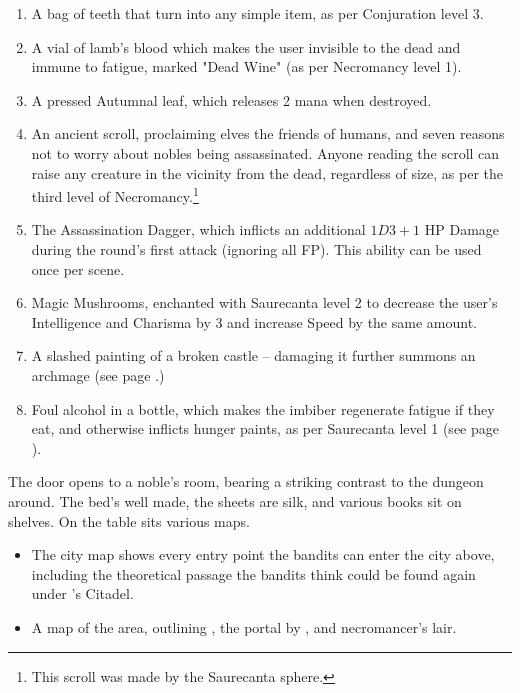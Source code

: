 \begin{multicols}{2}
\begin{enumerate}

	\item{A bag of teeth that turn into any simple item, as per Conjuration level 3.}
	\item{A vial of lamb's blood which makes the user invisible to the dead and immune to fatigue, marked "Dead Wine" (as per Necromancy level 1).}
	\item{A pressed Autumnal leaf, which releases 2 mana when destroyed.}
	\item{An ancient scroll, proclaiming elves the friends of humans, and seven reasons not to worry about nobles being assassinated.  Anyone reading the scroll can raise any creature in the vicinity from the dead, regardless of size, as per the third level of Necromancy.\footnote{This scroll was made by the Saurecanta sphere.}}
	\item{The Assassination Dagger, which inflicts an additional $1D3+1$ HP Damage during the round's first attack (ignoring all FP).  This ability can be used once per scene.}
	\item{Magic Mushrooms, enchanted with Saurecanta level 2 to decrease the user's Intelligence and Charisma by 3 and increase Speed by the same amount.}
	\item{A slashed painting of a broken castle -- damaging it further summons an archmage (see page \pageref{archmage}.)}
	\item{Foul alcohol in a bottle, which makes the imbiber regenerate fatigue if they eat, and otherwise inflicts hunger paints, as per Saurecanta level 1 (see page \pageref{saurecantaone}).}
\end{enumerate}


\begin{boxtext}
	The door opens to a noble's room, bearing a striking contrast to the dungeon around.  The bed's well made, the sheets are silk, and various books sit on shelves.  On the table sits various maps.
\end{boxtext}

\begin{itemize}

	\item{The city map shows every entry point the bandits can enter the city above, including the theoretical passage the bandits think could be found again under 's Citadel.}

	\item{A map of the area, outlining , the portal by , and \gls{necromancer}'s lair.}


\end{itemize}
\end{multicols}
